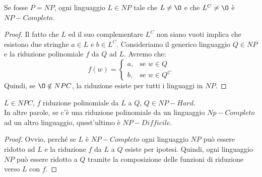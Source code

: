 \begin{lemm}[Implicazione di P=NP]
	Se fosse $P = NP$, ogni linguaggio $L \in NP$ tale che $L \neq \O$ e che $L^C \neq \O$ è $NP-Completo$.
\end{lemm}

\begin{proof}
	Il fatto che $L$ ed il suo complementare $L^C$ non siano vuoti implica che esistono due stringhe $a \in L$ e $b \in L^C$. Consideriamo il generico linguaggio $Q \in NP$ e la riduzione polinomiale $f$ da $Q$ ad $L$. Avremo che:
	$$
		f(w) = \begin{cases} a, & \mbox{se } w \in Q \\ b, & \mbox{se } w \in Q^C \end{cases}
	$$
	Quindi, se $\O \notin NPC$, la riduzione esiste per tutti i linguaggi in $NP$.
\end{proof}

\begin{lemm}
	$L \in NPC$, $f$ riduzione polinomiale da $L$ a $Q$, $Q \in NP-Hard$. \\
	In altre parole, se c'è una riduzione polinomiale da un linguaggio $Np-Completo$ ad un altro linguaggio, quest'ultimo è $NP-Difficile$.
\end{lemm}

\begin{proof}
	Ovvio, perché se $L$ è $NP-Completo$ ogni linguaggio $NP$ può essere ridotto ad $L$ e la riduzione $f$ da $L$ a $Q$ esiste per ipotesi. Quindi, ogni linguaggio $NP$ può essere ridotto a $Q$ tramite la composizione delle funzioni di riduzione verso $L$ con $f$.
\end{proof}
